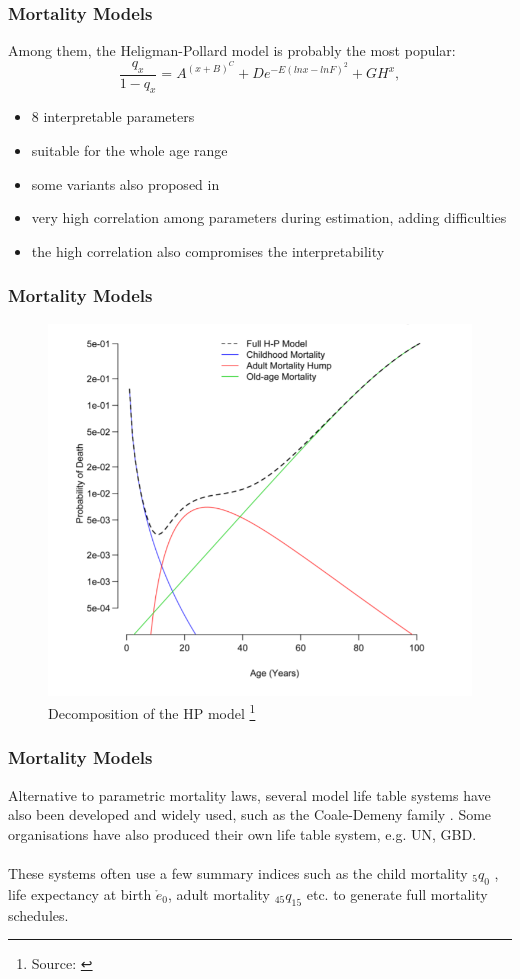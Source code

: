 \documentclass[hyperref={colorlinks, citecolor=blue}]{beamer}
\begin{document}
\begin{frame}
\frametitle{Mortality Models}
Among them, the Heligman-Pollard model \citep{heligman1980age} is probably the most popular:
\begin{equation*}
	\frac{q_x}{1-q_x} = A^{(x + B)^C} + D e^{-E(ln x - ln F)^2} + GH^x,
\end{equation*}

\begin{itemize}
\item 8 interpretable parameters
\item suitable for the whole age range
\item some variants also proposed in \citet{heligman1980age}
\item very high correlation among parameters during estimation, adding difficulties
\item the high correlation also compromises the interpretability
\end{itemize}
\end{frame}

\begin{frame}
\frametitle{Mortality Models}
\begin{figure}
\includegraphics[height=0.7\textheight]{Graphs/HP model.png}
\caption{Decomposition of the HP model \footnote[frame]{Source: \citet{sharrow2013age}}}
\end{figure}
\end{frame}

\begin{frame}
\frametitle{Mortality Models}
Alternative to parametric mortality laws, several model life table systems have also been developed and widely used, such as the Coale-Demeny family \citep{coale1966regional}. Some organisations have also produced their own life table system, e.g. UN, GBD. 
\\~\\
These systems often use a few summary indices such as the child mortality $_5q_0$ , life expectancy at birth $\mathring{e}_0$, adult mortality $_{45}q_{15}$ etc. to generate full mortality schedules.
\end{frame}
\end{document}
